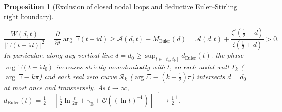 \documentclass[11pt,a4paper,reqno]{amsart}
\newtheorem{proposition}[theorem]{Proposition}
\theoremstyle{definition}
\theoremstyle{remark}
\numberwithin{equation}{section}
\newcommand{\ii}{\mathrm{i}}
\begin{document}
\begin{proposition}[Exclusion of closed nodal loops and deductive Euler--Stirling right boundary]
\begin{enumerate}
\begin{equation}\label{eq:euler_positivity}
\frac{W(d,t)}{\big|\Xi(t-\ii d)\big|^2} = \frac{\partial}{\partial t}\arg\Xi(t-\ii d) \ge \mathcal{A}(d,t) - M_{\mathrm{Euler}}(d) = \mathcal{A}(d,t) + \frac{\zeta'(\frac{1}{2}+d)}{\zeta(\frac{1}{2}+d)} > 0.
\end{equation}
In particular, along any vertical line $d = d_0 \ge \sup_{t \in [t_a, t_b]} d_{\mathrm{Euler}}(t)$, the phase $\arg\Xi(t-\ii d_0)$ increases strictly monotonically with $t$, so each nodal wall $\Gamma_k$ ($\arg\Xi \equiv k\pi$) and each real zero curve $\mathcal{R}_k$ ($\arg\Xi \equiv (k-\frac{1}{2})\pi$) intersects $d = d_0$ at most once and transversely. As $t \to \infty$, $d_{\mathrm{Euler}}(t) = \frac{1}{2} + [\frac{1}{2}\ln\frac{t}{2\pi} + \gamma_{\mathrm{E}} + \mathcal{O}((\ln t)^{-1})]^{-1} \to \frac{1}{2}^+$.
\end{enumerate}
\end{proposition}
\end{document}
